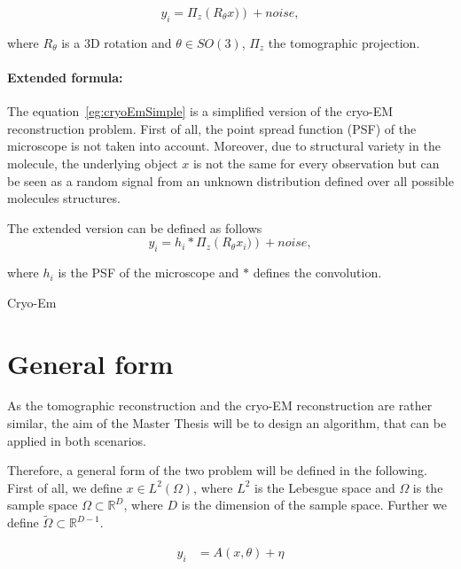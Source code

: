 \begin{equation}
    \label{eg:cryoEmSimple}
    y_i = \Pi_z \left( R_{\theta} x) \right) + noise,
\end{equation}

where $R_{\theta}$ is a 3D rotation and $\theta \in SO(3)$, $\Pi_z$ the tomographic projection.

\paragraph{Extended formula:} 
The equation~\ref{eg:cryoEmSimple} is a simplified version of the cryo-EM reconstruction problem.
First of all, the point spread function (PSF) of the microscope is not taken into account.
Moreover, due to structural variety in the molecule, the underlying object $x$ is not the same 
for every observation but can be seen as a random signal from an unknown distribution defined over all possible molecules structures.

The extended version can be defined as follows
\begin{equation}
    \label{eg:cryoEmExtended}
    y_i = h_i * \Pi_z \left( R_{\theta} x_i) \right) + noise,
\end{equation}

where $h_i$ is the PSF of the microscope and $*$ defines the convolution.

Cryo-Em


\section{General form}

As the tomographic reconstruction and the cryo-EM reconstruction are rather similar, 
the aim of the Master Thesis will be to design an algorithm, that can be applied in both scenarios.

Therefore, a general form of the two problem will be defined in the following.
First of all, we define $x \in L^2(\Omega)$, where $L^2$ is the Lebesgue space and $\Omega$
is the sample space $\Omega \subset \mathbb{R}^D$, where $D$ is the dimension of the sample space. 
Further we define $\tilde{\Omega} \subset \mathbb{R}^{D-1}$.


\begin{equation}
    \begin{aligned}
        y_i &= A(x, \theta) + \eta \\
    \end{aligned}
\end{equation}

